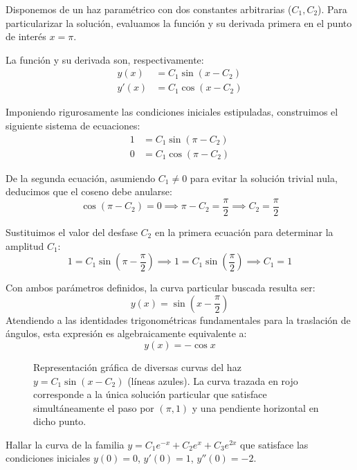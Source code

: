 \begin{tcolorbox}
Disponemos de un haz paramétrico con dos constantes arbitrarias ($C_1, C_2$). Para particularizar la solución, evaluamos la función y su derivada primera en el punto de interés $x = \pi$.

La función y su derivada son, respectivamente:
\begin{align*}
    y(x) &= C_1 \sin(x - C_2) \\
    y'(x) &= C_1 \cos(x - C_2)
\end{align*}

Imponiendo rigurosamente las condiciones iniciales estipuladas, construimos el siguiente sistema de ecuaciones:
\begin{align*}
    1 &= C_1 \sin(\pi - C_2) \\
    0 &= C_1 \cos(\pi - C_2)
\end{align*}

De la segunda ecuación, asumiendo $C_1 \neq 0$ para evitar la solución trivial nula, deducimos que el coseno debe anularse:
$$ \cos(\pi - C_2) = 0 \implies \pi - C_2 = \frac{\pi}{2} \implies C_2 = \frac{\pi}{2} $$

Sustituimos el valor del desfase $C_2$ en la primera ecuación para determinar la amplitud $C_1$:
$$ 1 = C_1 \sin\left(\pi - \frac{\pi}{2}\right) \implies 1 = C_1 \sin\left(\frac{\pi}{2}\right) \implies C_1 = 1 $$

Con ambos parámetros definidos, la curva particular buscada resulta ser:
$$ y(x) = \sin\left(x - \frac{\pi}{2}\right) $$
Atendiendo a las identidades trigonométricas fundamentales para la traslación de ángulos, esta expresión es algebraicamente equivalente a:
$$ y(x) = -\cos x $$

\begin{figure}[H]
    \centering
    
    \caption{Representación gráfica de diversas curvas del haz $y = C_1 \sin(x - C_2)$ (líneas azules). La curva trazada en rojo corresponde a la única solución particular que satisface simultáneamente el paso por $(\pi, 1)$ y una pendiente horizontal en dicho punto.}
\end{figure}
\end{tcolorbox}

\begin{ejercicio}
Hallar la curva de la familia $y = C_1 e^{-x} + C_2 e^x + C_3 e^{2x}$ que satisface las condiciones iniciales $y(0) = 0$, $y'(0) = 1$, $y''(0) = -2$.
\end{ejercicio}

